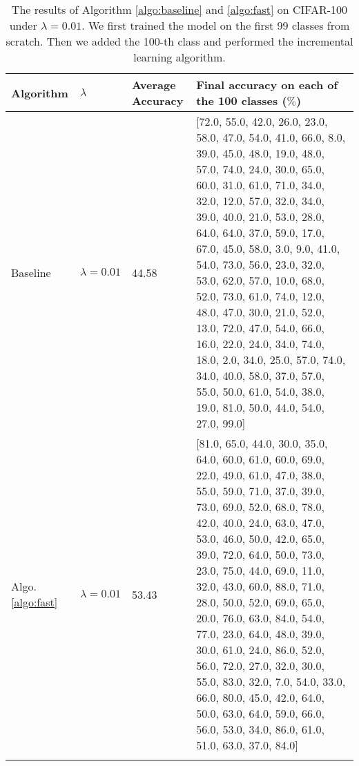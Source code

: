 \begin{table}[!hpb]
	\centering
	\caption[The results of Algorithm \ref{algo:baseline} and \ref{algo:fast} on CIFAR-100 under $\lambda=0.01$]
	{The results of Algorithm \ref{algo:baseline} and \ref{algo:fast} on CIFAR-100 under $\lambda=0.01$. We first trained the model on the first 99 classes from scratch. Then we added the 100-th class and performed the incremental learning algorithm.}
	\begin{tabular}{@{}lllp{8cm}@{}} \toprule
		Algorithm & $\lambda$ &Average Accuracy&  Final accuracy on each of the 100 classes ($\%$)\\ \midrule
		Baseline&$\lambda=0.01$&  44.58& [72.0, 55.0, 42.0, 26.0, 23.0, 58.0, 47.0, 54.0, 41.0, 66.0, 8.0, 39.0, 45.0, 48.0, 19.0, 48.0, 57.0, 74.0, 24.0, 30.0, 65.0, 60.0, 31.0, 61.0, 71.0, 34.0, 32.0, 12.0, 57.0, 32.0, 34.0, 39.0, 40.0, 21.0, 53.0, 28.0, 64.0, 64.0, 37.0, 59.0, 17.0, 67.0, 45.0, 58.0, 3.0, 9.0, 41.0, 54.0, 73.0, 56.0, 23.0, 32.0, 53.0, 62.0, 57.0, 10.0, 68.0, 52.0, 73.0, 61.0, 74.0, 12.0, 48.0, 47.0, 30.0, 21.0, 52.0, 13.0, 72.0, 47.0, 54.0, 66.0, 16.0, 22.0, 24.0, 34.0, 74.0, 18.0, 2.0, 34.0, 25.0, 57.0, 74.0, 34.0, 40.0, 58.0, 37.0, 57.0, 55.0, 50.0, 61.0, 54.0, 38.0, 19.0, 81.0, 50.0, 44.0, 54.0, 27.0, 99.0]\\
		Algo. \ref{algo:fast}&$\lambda=0.01$&  53.43& [81.0, 65.0, 44.0, 30.0, 35.0, 64.0, 60.0, 61.0, 60.0, 69.0, 22.0, 49.0, 61.0, 47.0, 38.0, 55.0, 59.0, 71.0, 37.0, 39.0, 73.0, 69.0, 52.0, 68.0, 78.0, 42.0, 40.0, 24.0, 63.0, 47.0, 53.0, 46.0, 50.0, 42.0,
		65.0, 39.0, 72.0, 64.0, 50.0, 73.0, 23.0, 75.0, 44.0, 69.0, 11.0, 32.0, 43.0, 60.0, 88.0, 71.0, 28.0, 50.0, 52.0, 69.0, 65.0, 20.0, 76.0, 63.0, 84.0, 54.0, 77.0, 23.0, 64.0, 48.0, 39.0, 30.0, 61.0, 24.0,
		86.0, 52.0, 56.0, 72.0, 27.0, 32.0, 30.0, 55.0, 83.0, 32.0, 7.0, 54.0, 33.0, 66.0, 80.0, 45.0, 42.0, 64.0, 50.0, 63.0, 64.0, 59.0, 66.0, 56.0, 53.0, 34.0, 86.0, 61.0, 51.0, 63.0, 37.0, 84.0]
		\\ \bottomrule
		\label{tab:fast0.01}
	\end{tabular}
\end{table}


